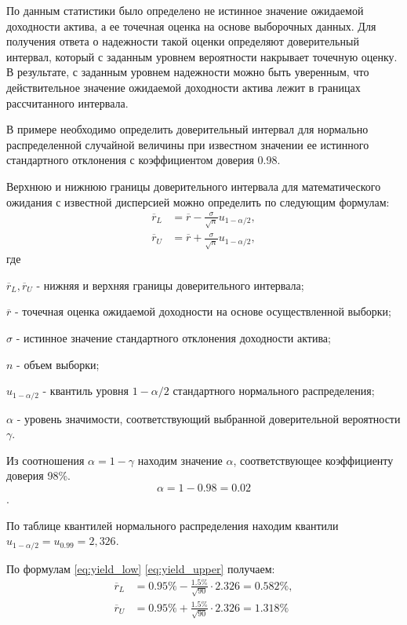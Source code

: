 \documentclass[12pt, table, twoside, a4paper]{exam}
\begin{document}
\begin{questions}
\begin{solution}[8em]
	\raggedright
	По данным статистики было определено не истинное значение ожидаемой доходности актива, а ее точечная оценка на основе выборочных данных. Для получения ответа о надежности такой оценки определяют доверительный интервал, который с заданным уровнем вероятности накрывает точечную оценку. В результате, с заданным уровнем надежности можно быть уверенным, что действительное значение ожидаемой доходности актива лежит в границах рассчитанного интервала.
	
	В примере необходимо определить доверительный интервал для нормально распределенной случайной величины при известном значении ее истинного стандартного отклонения с коэффициентом доверия 0.98.
	
	Верхнюю и нижнюю границы доверительного интервала для математического ожидания с известной дисперсией можно определить по следующим формулам:
	\begin{align}
	\label{eq:yield_low}
	\overline{r}_L &=\overline{r}-\frac{\sigma}{\sqrt{n}}u_{1-\alpha/2},\\[8pt]
	\label{eq:yield_upper}
	\overline{r}_U &=\overline{r}+\frac{\sigma}{\sqrt{n}}u_{1-\alpha/2},
	\end{align}
	где
	
	$\overline{r}_L, \overline{r}_U$ - нижняя и верхняя  границы доверительного интервала;
	
	$\overline{r}$ - точечная оценка ожидаемой доходности на основе осуществленной выборки;
	
	$\sigma$ - истинное значение стандартного отклонения доходности актива;
	
	$n$ - объем выборки;
	
	$u_{1-\alpha/2}$ - квантиль уровня $1-\alpha/2$ стандартного нормального распределения;
	
	$\alpha$ - уровень значимости, соответствующий выбранной доверительной вероятности $\gamma$.
	
	Из соотношения $\alpha=1-\gamma$ находим значение $\alpha$, соответствующее коэффициенту доверия 98\%.
	$$\alpha=1-0.98=0.02$$.
	
	По таблице квантилей нормального распределения находим квантили $u_{1-\alpha/2}=u_{0.99}=2,326$.
	
	По формулам \eqref{eq:yield_low} \eqref{eq:yield_upper} получаем:
	\begin{align*}
	\overline{r}_L&=0.95\% - \frac{1.5\%}{\sqrt{90}} \cdot 2.326 
	= 0.582\%, \\
	\overline{r}_U&=0.95\% + \frac{1.5\%}{\sqrt{90}} \cdot 2.326 =1.318\%
	\end{align*}
\end{solution}



\end{questions}
\end{document}
